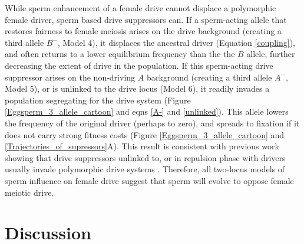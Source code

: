 \documentclass[12pt,letterpaper]{article}
\newcommand{\gc}[1]{{ \color{red} #1}}
\newcommand{\yb}[1]{{ \color{blue} #1}}
\begin{document}
While  sperm enhancement of a female drive cannot displace a polymorphic female driver, sperm based drive suppressors can. 
If a sperm-acting allele that restores fairness to female meiosis arises on
	the drive background (creating a third allele $B^{-}$, Model 4), it displaces the ancestral driver (Equation \ref{coupling}), 
	and often returns to a lower equilibrium frequency than the the $B$ allele, further decreasing the extent of drive in the population.  
If this sperm-acting drive suppressor arises on 
	the non-driving $A$ background (creating a third allele $A^{-}$, Model 5), 
	or is unlinked to the drive locus (Model 6), it readily invades a population segregating
	for the drive system (Figure \ref{Eggsperm_3_allele_cartoon} and eqns \ref{A-} and \ref{unlinked}).  
This allele lowers the frequency of the original driver (perhaps to zero),
	and spreads to fixation if it does not carry strong fitness costs
	(Figure \ref{Eggsperm_3_allele_cartoon} and \ref{Trajectories_of_supressors}A). 
This result is consistent with previous work showing that drive suppressors unlinked to, or in repulsion phase with drivers usually invade polymorphic drive systems \citep[e.g. ][]{Brandvain2012}.  
Therefore, all two-locus models of sperm influence on female drive suggest that
	sperm will evolve to oppose female meiotic drive.



\section*{Discussion}
\end{document}
